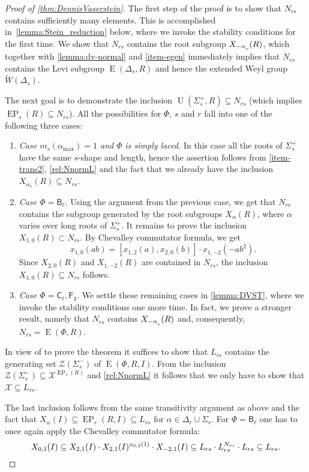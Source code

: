\documentclass[11pt]{amsart}
\theoremstyle{plain}
\numberwithin{equation}{section}
\numberwithin{lemma}{section}
\theoremstyle{definition}
\theoremstyle{remark}
\DeclareMathOperator{\E}{E}
\DeclareMathOperator{\EP}{EP}
\DeclareMathOperator{\U}{U}
\newcommand{\rB}{\mathsf{B}}
\newcommand{\rC}{\mathsf{C}}
\newcommand{\rF}{\mathsf{F}}
\def\ssub#1{\mathchoice
   {_{\lower2pt\hbox{$\scriptstyle #1$}}}
   {_{\lower2pt\hbox{$\scriptstyle #1$}}}
   {_{\lower1.5pt\hbox{$\scriptscriptstyle #1$}}}
   {_{\!\lower1.5pt\hbox{$\scriptscriptstyle #1$}}}}
\begin{document}
\begin{proof} [Proof of \cref{thm:DennisVaserstein}]
The first step of the proof is to show that $N_{rs}$ contains sufficiently many elements. 
This is accomplished in~\cref{lemma:Stein_reduction} below, where we invoke the stability conditions for the first time.
We show that $N_{rs}$ contains the root subgroup $X_{-\alpha\ssub{r}}(R)$, which together with \cref{lemma:dv-normal} and \cref{item-egen} immediately implies that $N_{rs}$ contains the Levi subgroup $\E(\Delta_s, R)$ and hence the extended Weyl group $\widetilde{W}(\Delta_s)$.

The next goal is to demonstrate the inclusion $\U(\Sigma_s^+, R) \subseteq N_{rs}$ (which implies $\EP_s(R) \subseteq N_{rs}$).
All the possibilities for $\Phi$, $s$ and $r$ fall into one of the following three cases:
\begin{enumerate}
 \item \textit{Case $m_s(\alpha_{\mathrm{max}})=1$ and $\Phi$ is simply laced.}
  In this case all the roots of $\Sigma^+_s$ have the same $s$-shape and length, hence the assertion follows from \cref{item-trans2}, \eqref{rel:NnormL} and the fact that we already have the inclusion $X_{\alpha_s}(R) \subseteq N_{rs}$.
 \item \textit{Case $\Phi = \rB_\ell$.} Using the argument from the previous case, we get that $N_{rs}$ contains the subgroup generated by the root subgroups $X_\alpha(R)$, where $\alpha$ varies over long roots of $\Sigma_s^+$. 
  It remains to prove the inclusion $X_{1, 0}(R) \subset N_{rs}$.
  By Chevalley commutator formula, we get
\begin{equation*} \label{rel:CCF-specBC}
x_{1, 0}(ab) = [x_{1, 2}(a), x_{2, 0}(b)] \cdot x_{1, -2}(-a b^2).
\end{equation*}
  Since $X_{2, 0}(R)$ and $X_{1, -2}(R)$ are contained in $N_{rs}$, the inclusion $X_{1, 0}(R) \subseteq N_{rs}$ follows.
 \item \textit{Case $\Phi = \rC_\ell, \rF_4$.}
 We settle these remaining cases in \cref{lemma:DVST}, where we invoke the stability conditions one more time. 
 In fact, we prove a stronger result, namely that $N_{rs}$ contains $X_{-\alpha\ssub{s}}(R)$ and, consequently, $N_{rs} = \E(\Phi, R)$.
\end{enumerate}

In view of \cite[Theorem~3.4]{S} to prove the theorem it suffices to show that $L_{rs}$ contains the generating set $\mathcal{Z}(\Sigma_s^-)$ of $\E(\Phi, R, I)$.
From the inclusion $\mathcal{Z}(\Sigma_s^-) \subseteq \mathcal{X}^{\EP_s(R)}$ and \eqref{rel:NnormL} it follows that we only have to show that $\mathcal{X} \subseteq L_{rs}$.

The last inclusion follows from the same transitivity argument as above and the fact that $X_\alpha(I) \subseteq \EP_r(R, I) \subseteq L_{rs}$ for $\alpha \in \Delta_r \cup \Sigma_r$.
For $\Phi=\rB_\ell$ one has to once again apply the Chevalley commutator formula:
\[ X_{0, 1}(I) \subseteq X_{2, 1}(I) \cdot X_{2, 1}(I)^{x_{0, 2}(1)} \cdot X_{-2, 1}(I) \subseteq L_{rs} \cdot L_{rs}^{N_{rs}} \cdot L_{rs} \subseteq L_{rs}. \qedhere \] 
\end{proof}
\end{document}
